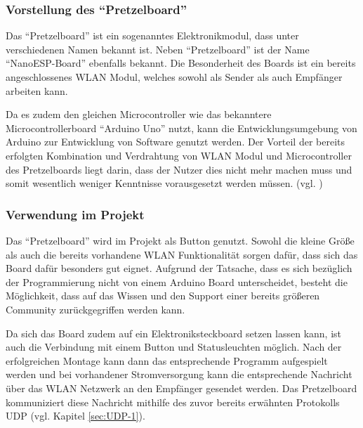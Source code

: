 \subsubsection{Vorstellung des ``Pretzelboard''}        
\label{sec:Vorstellung des ``Pretzelboard''} 
Das ``Pretzelboard'' ist ein sogenanntes Elektronikmodul, dass unter verschiedenen Namen bekannt ist. Neben ``Pretzelboard'' ist der Name ``NanoESP-Board'' ebenfalls bekannt. Die Besonderheit des Boards ist ein bereits angeschlossenes WLAN Modul, welches sowohl als Sender als auch Empfänger arbeiten kann. 

Da es zudem den gleichen Microcontroller wie das bekanntere Microcontrollerboard ``Arduino Uno'' nutzt, kann die Entwicklungsumgebung von Arduino zur Entwicklung von Software genutzt werden. 
Der Vorteil der bereits erfolgten Kombination und Verdrahtung von WLAN Modul und Microcontroller des Pretzelboards liegt darin, dass der Nutzer dies nicht mehr machen muss und somit wesentlich weniger Kenntnisse vorausgesetzt werden müssen. (vgl. \cite{.b}\cite{.kafka}\cite{FranzisVerlagGmbH.27.11.2015})


\subsubsection{Verwendung im Projekt}        
\label{sec:Verwendung des ``Pretzelboard''} 
Das ``Pretzelboard'' wird im Projekt als Button genutzt. Sowohl die kleine Größe als auch die bereits vorhandene WLAN Funktionalität sorgen dafür, dass sich das Board dafür besonders gut eignet. Aufgrund der Tatsache, dass es sich bezüglich der Programmierung nicht von einem Arduino Board unterscheidet, besteht die Möglichkeit, dass auf das Wissen und den Support einer bereits größeren Community zurückgegriffen werden kann. 

Da sich das Board zudem auf ein Elektroniksteckboard setzen lassen kann, ist auch die Verbindung mit einem Button und Statusleuchten möglich. Nach der erfolgreichen Montage kann dann das entsprechende Programm aufgespielt werden und bei vorhandener Stromversorgung kann die entsprechende Nachricht über das WLAN Netzwerk an den Empfänger gesendet werden. Das Pretzelboard kommuniziert diese Nachricht mithilfe des zuvor bereits erwähnten Protokolls \ac{UDP} (vgl. Kapitel \ref{sec:UDP-1}).

